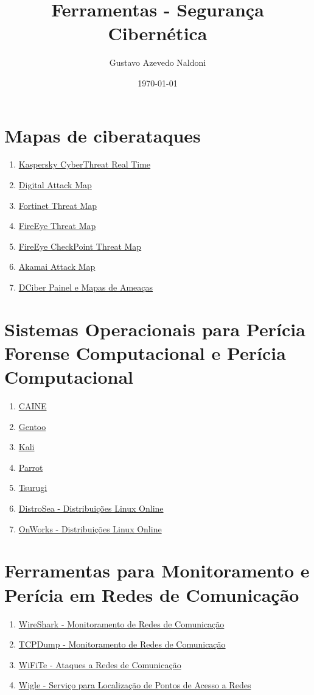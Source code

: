 \documentclass{article}
\title{Ferramentas - Segurança Cibernética}
\author{Gustavo Azevedo Naldoni}
\date{\today}
\begin{document}
\maketitle
\newpage
\tableofcontents
\newpage
\section{Mapas de ciberataques}
\begin{enumerate}
\item \href{https://cybermap.kaspersky.com/}{Kaspersky CyberThreat Real Time}
\item \href{https://www.digitalattackmap.com/#anim=1&color=0&country=ALL&list=0&time=18763&view=map}{Digital Attack Map}
\item \href{https://threatmap.fortiguard.com/}{Fortinet Threat Map}
\item \href{https://threatmap.checkpoint.com/}{FireEye Threat Map}
\item \href{https://threatmap.checkpoint.com/}{FireEye CheckPoint Threat Map}
\item \href{https://www.akamai.com/internet-station/cyber-attacks}{Akamai Attack Map}
\item \href{https://dciber.org/mapas-de-ameacas/}{DCiber Painel e Mapas de Ameaças}
\end{enumerate}
\section{Sistemas Operacionais para Perícia Forense Computacional e Perícia Computacional}
\begin{enumerate}
\item \href{https://www.caine-live.net/}{CAINE}
\item \href{https://www.gentoo.org/}{Gentoo}
\item \href{https://www.kali.org/}{Kali}
\item \href{https://www.parrotsec.org/}{Parrot}
\item \href{https://tsurugi-linux.org/}{Tsurugi}
\item \href{https://distrosea.com/}{DistroSea - Distribuições Linux Online}
\item \href{https://www.onworks.net/}{OnWorks - Distribuições Linux Online}
\end{enumerate}
\section{Ferramentas para Monitoramento e Perícia em Redes de Comunicação}
\begin{enumerate}
\item \href{https://www.wireshark.org/download.html}{WireShark - Monitoramento de Redes de Comunicação}
\item \href{https://www.tcpdump.org/}{TCPDump - Monitoramento de Redes de Comunicação}
\item \href{https://tools.kali.org/wireless-attacks/wifite}{WiFiTe - Ataques a Redes de Comunicação}
\item \href{https://wigle.net/}{Wigle - Serviço para Localização de Pontos de Acesso a Redes}
\end{enumerate}
\end{document}
